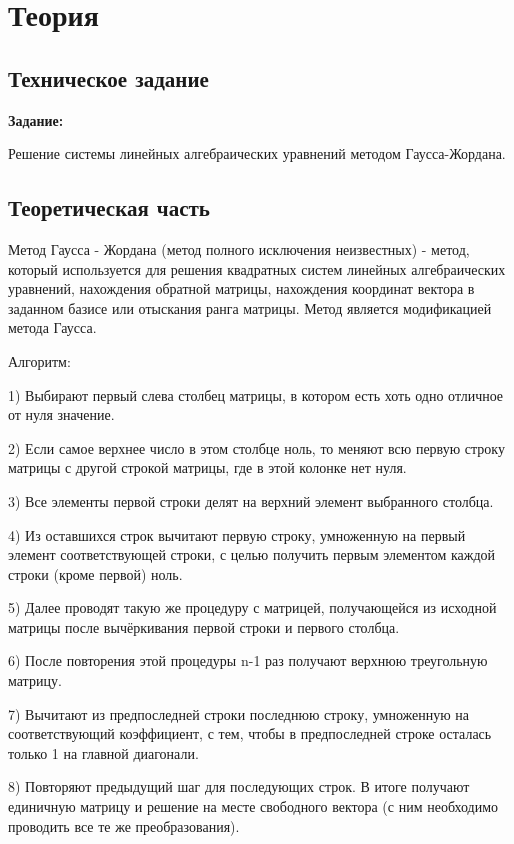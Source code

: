 \documentclass[12pt,a4paper]{scrartcl}
\begin{document}
\large\tableofcontents

\newpage

\section{Теория}
\subsection{Техническое задание}
\textbf {Задание:}

Решение системы линейных алгебраических уравнений методом Гаусса-Жордана.

\subsection{Теоретическая часть}

Метод Гаусса - Жордана (метод полного исключения неизвестных) - метод, который используется для решения квадратных систем линейных алгебраических уравнений, нахождения обратной матрицы, нахождения координат вектора в заданном базисе или отыскания ранга матрицы. Метод является модификацией метода Гаусса. 

Алгоритм:\textit{}

1)	Выбирают первый слева столбец матрицы, в котором есть хоть одно отличное от нуля значение.\textit{}

2)	Если самое верхнее число в этом столбце ноль, то меняют всю первую строку матрицы с другой строкой матрицы, где в этой колонке нет нуля.\textit{}

3)	Все элементы первой строки делят на верхний элемент выбранного столбца.\textit{}

4)	Из оставшихся строк вычитают первую строку, умноженную на первый элемент соответствующей строки, с целью получить первым элементом каждой строки (кроме первой) ноль.\textit{}

5)	Далее проводят такую же процедуру с матрицей, получающейся из исходной матрицы после вычёркивания первой строки и первого столбца.\textit{}

6)	После повторения этой процедуры n-1 раз получают верхнюю треугольную матрицу.\textit{}

7)	Вычитают из предпоследней строки последнюю строку, умноженную на соответствующий коэффициент, с тем, чтобы в предпоследней строке осталась только 1 на главной диагонали.\textit{}

8)	Повторяют предыдущий шаг для последующих строк. В итоге получают единичную матрицу и решение на месте свободного вектора (с ним необходимо проводить все те же преобразования).
\end{document}
